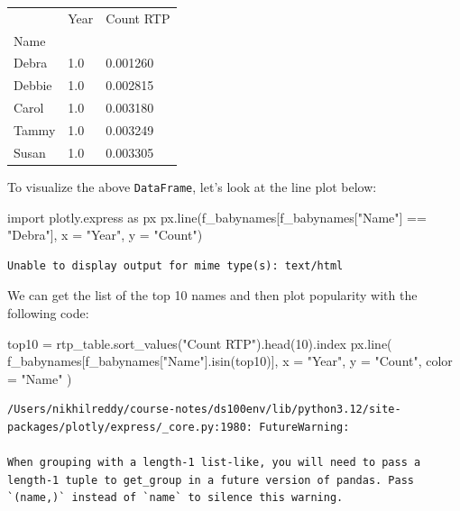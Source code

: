 \documentclass[
  letterpaper,
  DIV=11,
  numbers=noendperiod]{scrreprt}
\newenvironment{Shaded}{\begin{snugshade}}{\end{snugshade}}
\newcommand{\DecValTok}[1]{\textcolor[rgb]{0.68,0.00,0.00}{#1}}
\newcommand{\ImportTok}[1]{\textcolor[rgb]{0.00,0.46,0.62}{#1}}
\newcommand{\NormalTok}[1]{\textcolor[rgb]{0.00,0.23,0.31}{#1}}
\newcommand{\OperatorTok}[1]{\textcolor[rgb]{0.37,0.37,0.37}{#1}}
\newcommand{\StringTok}[1]{\textcolor[rgb]{0.13,0.47,0.30}{#1}}
\begin{document}
\begin{longtable}[]{@{}lll@{}}
\toprule\noalign{}
& Year & Count RTP \\
Name & & \\
\midrule\noalign{}
\endhead
\bottomrule\noalign{}
\endlastfoot
Debra & 1.0 & 0.001260 \\
Debbie & 1.0 & 0.002815 \\
Carol & 1.0 & 0.003180 \\
Tammy & 1.0 & 0.003249 \\
Susan & 1.0 & 0.003305 \\
\end{longtable}

To visualize the above \texttt{DataFrame}, let's look at the line plot
below:

\begin{Shaded}
\begin{Highlighting}[]
\ImportTok{import}\NormalTok{ plotly.express }\ImportTok{as}\NormalTok{ px}
\NormalTok{px.line(f\_babynames[f\_babynames[}\StringTok{"Name"}\NormalTok{] }\OperatorTok{==} \StringTok{"Debra"}\NormalTok{], x }\OperatorTok{=} \StringTok{"Year"}\NormalTok{, y }\OperatorTok{=} \StringTok{"Count"}\NormalTok{)}
\end{Highlighting}
\end{Shaded}

\begin{verbatim}
Unable to display output for mime type(s): text/html
\end{verbatim}

We can get the list of the top 10 names and then plot popularity with
the following code:

\begin{Shaded}
\begin{Highlighting}[]
\NormalTok{top10 }\OperatorTok{=}\NormalTok{ rtp\_table.sort\_values(}\StringTok{"Count RTP"}\NormalTok{).head(}\DecValTok{10}\NormalTok{).index}
\NormalTok{px.line(}
\NormalTok{    f\_babynames[f\_babynames[}\StringTok{"Name"}\NormalTok{].isin(top10)], }
\NormalTok{    x }\OperatorTok{=} \StringTok{"Year"}\NormalTok{, }
\NormalTok{    y }\OperatorTok{=} \StringTok{"Count"}\NormalTok{, }
\NormalTok{    color }\OperatorTok{=} \StringTok{"Name"}
\NormalTok{)}
\end{Highlighting}
\end{Shaded}

\begin{verbatim}
/Users/nikhilreddy/course-notes/ds100env/lib/python3.12/site-packages/plotly/express/_core.py:1980: FutureWarning:

When grouping with a length-1 list-like, you will need to pass a length-1 tuple to get_group in a future version of pandas. Pass `(name,)` instead of `name` to silence this warning.
\end{verbatim}
\end{document}
